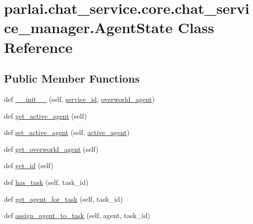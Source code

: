 \hypertarget{classparlai_1_1chat__service_1_1core_1_1chat__service__manager_1_1AgentState}{}\section{parlai.\+chat\+\_\+service.\+core.\+chat\+\_\+service\+\_\+manager.\+Agent\+State Class Reference}
\label{classparlai_1_1chat__service_1_1core_1_1chat__service__manager_1_1AgentState}
\subsection*{Public Member Functions}
\begin{DoxyCompactItemize}
\item 
def \hyperlink{classparlai_1_1chat__service_1_1core_1_1chat__service__manager_1_1AgentState_a9b5a2611095c2f946898f1d77fa38f38}{\+\_\+\+\_\+init\+\_\+\+\_\+} (self, \hyperlink{classparlai_1_1chat__service_1_1core_1_1chat__service__manager_1_1AgentState_ae81955487ddb55627cf08956490fb3a9}{service\+\_\+id}, \hyperlink{classparlai_1_1chat__service_1_1core_1_1chat__service__manager_1_1AgentState_a1780b29283e18b7b7e6d674ba5ea0907}{overworld\+\_\+agent})
\item 
def \hyperlink{classparlai_1_1chat__service_1_1core_1_1chat__service__manager_1_1AgentState_a7f50564fa800017500730abdc36a6cbc}{get\+\_\+active\+\_\+agent} (self)
\item 
def \hyperlink{classparlai_1_1chat__service_1_1core_1_1chat__service__manager_1_1AgentState_ab2caf3eced8c9eac55b76ecdd292b955}{set\+\_\+active\+\_\+agent} (self, \hyperlink{classparlai_1_1chat__service_1_1core_1_1chat__service__manager_1_1AgentState_a7a655f0e572d17c98d0651024a88799d}{active\+\_\+agent})
\item 
def \hyperlink{classparlai_1_1chat__service_1_1core_1_1chat__service__manager_1_1AgentState_a70c633ce420183c76f5965fe9a638be4}{get\+\_\+overworld\+\_\+agent} (self)
\item 
def \hyperlink{classparlai_1_1chat__service_1_1core_1_1chat__service__manager_1_1AgentState_adaab949a7dfa5f97a50fb2f32efd4549}{get\+\_\+id} (self)
\item 
def \hyperlink{classparlai_1_1chat__service_1_1core_1_1chat__service__manager_1_1AgentState_abdf5c5efdb7b58145197c579350920c2}{has\+\_\+task} (self, task\+\_\+id)
\item 
def \hyperlink{classparlai_1_1chat__service_1_1core_1_1chat__service__manager_1_1AgentState_ac8c982b90aef36093475088d15d46b72}{get\+\_\+agent\+\_\+for\+\_\+task} (self, task\+\_\+id)
\item 
def \hyperlink{classparlai_1_1chat__service_1_1core_1_1chat__service__manager_1_1AgentState_acd466dee9263f15df73ae187a64f0741}{assign\+\_\+agent\+\_\+to\+\_\+task} (self, agent, task\+\_\+id)
\end{DoxyCompactItemize}
